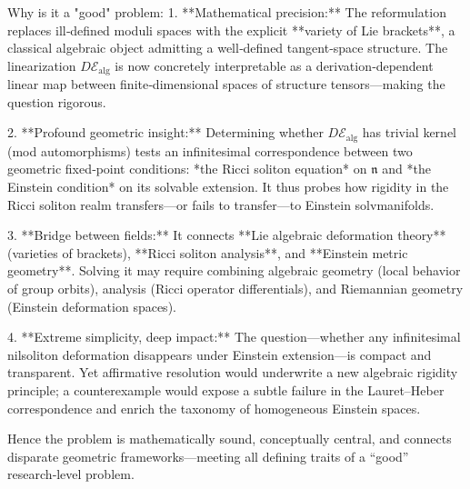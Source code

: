 Why is it a "good" problem:  
1. **Mathematical precision:**  
   The reformulation replaces ill‑defined moduli spaces with the explicit **variety of Lie brackets**, a classical algebraic object admitting a well‑defined tangent‑space structure. The linearization \(D\mathcal{E}_{\mathrm{alg}}\) is now concretely interpretable as a derivation‑dependent linear map between finite‑dimensional spaces of structure tensors—making the question rigorous.

2. **Profound geometric insight:**  
   Determining whether \(D\mathcal{E}_{\mathrm{alg}}\) has trivial kernel (mod automorphisms) tests an infinitesimal correspondence between two geometric fixed‑point conditions:  
   *the Ricci soliton equation* on \(\mathfrak{n}\) and *the Einstein condition* on its solvable extension.  
   It thus probes how rigidity in the Ricci soliton realm transfers—or fails to transfer—to Einstein solvmanifolds.

3. **Bridge between fields:**  
   It connects **Lie algebraic deformation theory** (varieties of brackets), **Ricci soliton analysis**, and **Einstein metric geometry**. Solving it may require combining algebraic geometry (local behavior of group orbits), analysis (Ricci operator differentials), and Riemannian geometry (Einstein deformation spaces).

4. **Extreme simplicity, deep impact:**  
   The question—whether any infinitesimal nilsoliton deformation disappears under Einstein extension—is compact and transparent. Yet affirmative resolution would underwrite a new algebraic rigidity principle; a counterexample would expose a subtle failure in the Lauret–Heber correspondence and enrich the taxonomy of homogeneous Einstein spaces.

Hence the problem is mathematically sound, conceptually central, and connects disparate geometric frameworks—meeting all defining traits of a “good” research‑level problem.